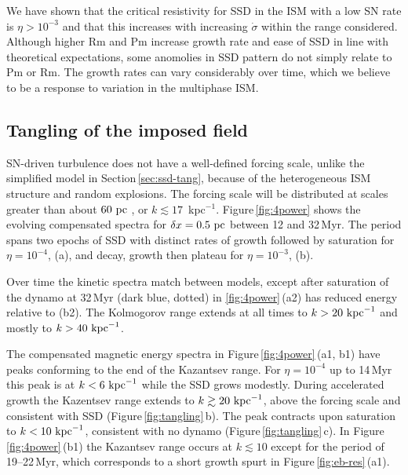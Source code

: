 \documentclass[preprint2]{aastex63}
\newcommand\kpc{~ {\rm kpc}}
\newcommand\pc{~ {\rm pc}}
\newcommand\dx{ {\delta x}}
\newcommand{\fg}[1]{\textcolor{midgreen}{#1}}
\begin{document}
 \fg{We have shown that the critical resistivity for SSD in the ISM with a
 low SN rate is $\eta>10^{-3}$ and that this increases with increasing
 $\dot\sigma$ within the range considered.
 Although higher Rm and Pm increase growth rate and ease of SSD in
 line with theoretical expectations, some anomolies in SSD pattern
 do not simply relate to Pm or Rm.
 The growth rates can vary considerably over time, which we believe to be a 
 response to variation in the multiphase ISM.
 }
 
\subsection{\fg{Tangling of the imposed field}} \label{sec:Balsara}
  
 SN-driven turbulence does not have a well-defined forcing scale, unlike the
 simplified model in Section\,\ref{sec:ssd-tang}, because of the
 heterogeneous ISM structure and random explosions.
 The forcing scale will be distributed at scales greater than about $60\pc$
 \citep[][Table\,3]{HSSFG17}, or $k\lesssim17$~kpc$^{-1}$. 
 Figure\,\ref{fig:4power} shows the evolving compensated spectra for 
 $\dx=0.5\pc$ between \fg{12} and 32\,Myr.
 \fg{The period spans two epochs of SSD with distinct rates of growth 
 followed by saturation for $\eta=10^{-4}$, (a), and decay, growth then plateau
 for $\eta=10^{-3}$, (b).}

 Over time the kinetic spectra match between models, except after saturation
 of the dynamo at 32\,Myr \fg{(dark blue, dotted) in \ref{fig:4power}\,(a2) 
 has reduced energy relative to (b2)}.
 The Kolmogorov range extends at all times to $k>20\kpc^{-1}$ and mostly 
 to $k>40\kpc^{-1}$. 

 The compensated magnetic energy spectra in Figure\,\ref{fig:4power}\,(a1, b1)
 have \fg{peaks conforming to the end of the Kazantsev range.
 For $\eta=10^{-4}$ up to 14\,Myr this peak is at $k<6\kpc^{-1}$ while the
 SSD grows modestly.
 During accelerated growth the Kazentsev range extends to}
 $k\gtrsim 20\kpc^{-1}$, above the forcing scale and consistent with SSD
 (Figure\,\ref{fig:tangling}\,b).
 The peak contracts upon saturation to $k<10\kpc^{-1}$, consistent with no
 dynamo (Figure\,\ref{fig:tangling}\,c).
 In Figure\,\ref{fig:4power}\,(b1) the Kazantsev range occurs at $k\lesssim10$
 except for the period of 19--22\,Myr, which corresponds to a short growth
 spurt in Figure\,\ref{fig:eb-res}\,(a1).
\end{document}
